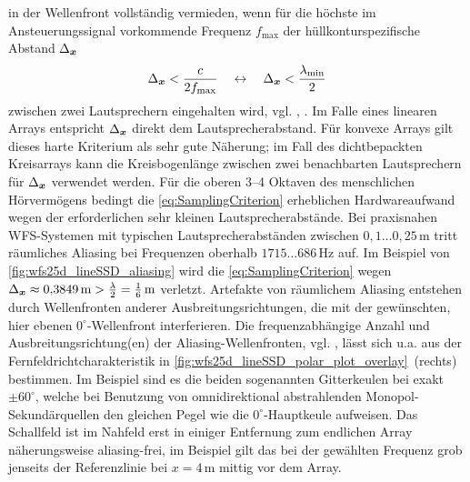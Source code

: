 in der Wellenfront vollständig vermieden, wenn für die höchste im Ansteuerungssignal
vorkommende Frequenz $f_\text{max}$ der hüllkonturspezifische Abstand
$\Delta_{\bm{x}}$
\begin{align}
\label{eq:SamplingCriterion}
\Delta_{\bm{x}} < \frac{c}{2 f_\text{max}}\quad\leftrightarrow\quad
\Delta_{\bm{x}} < \frac{\lambda_\text{min}}{2}
\end{align}
zwischen zwei Lautsprechern eingehalten wird, vgl. \cite[S.~246]{Stenzel1927},
\cite[Kap.~4]{Winter2019_diss}.
%
Im Falle eines linearen Arrays entspricht $\Delta_{\bm{x}}$ direkt dem
Lautsprecherabstand.
%
Für konvexe Arrays gilt dieses harte Kriterium als sehr gute Näherung;
im Fall des dichtbepackten Kreisarrays kann die Kreisbogenlänge zwischen
zwei benachbarten Lautsprechern für $\Delta_{\bm{x}}$ verwendet werden.
%
Für die oberen 3--4 Oktaven des menschlichen Hörvermögens bedingt
die \Glg\eqref{eq:SamplingCriterion}
erheblichen Hardwareaufwand wegen der erforderlichen sehr kleinen
Lautsprecherabstände.
%
Bei praxisnahen WFS-Systemen mit typischen Lautsprecherabständen zwischen
$0{,}1 \dots 0{,}25\,\text{m}$ tritt räumliches Aliasing bei Frequenzen oberhalb
$1715 \dots 686\,\text{Hz}$
auf.
%
Im Beispiel von \Abb\ref{fig:wfs25d_lineSSD_aliasing} wird die
\Glg\eqref{eq:SamplingCriterion}
wegen
$\Delta_{\bm{x}}\approx 0{,}3849\,\text{m} > \frac{\lambda}{2}=\frac{1}{6}\,\text{m}$
verletzt.
%
Artefakte von räumlichem Aliasing entstehen durch Wellenfronten anderer
Ausbreitungsrichtungen, die mit der gewünschten, hier ebenen $0^\circ$-Wellenfront
interferieren.
%
Die frequenzabhängige Anzahl und Ausbreitungsrichtung(en) der
Aliasing-Wellenfronten,
vgl. \cite{Stenzel1927,Berkhout1993_JASA,Start1997_diss, Winter2019_diss},
lässt sich u.a. aus der
Fernfeldrichtcharakteristik in
\Abb\ref{fig:wfs25d_lineSSD_polar_plot_overlay}~(rechts) bestimmen.
%
Im Beispiel sind es die beiden sogenannten Gitterkeulen
bei exakt $\pm 60^\circ$,
welche bei Benutzung von omnidirektional abstrahlenden
Monopol-Sekundärquellen
den gleichen Pegel wie die $0^\circ$-Hauptkeule
aufweisen.
%
Das Schallfeld ist im Nahfeld erst in einiger Entfernung zum endlichen Array
näherungsweise aliasing-frei, im Beispiel gilt das bei der gewählten Frequenz
grob jenseits der Referenzlinie bei $x=4$\,m mittig vor dem Array.
%



